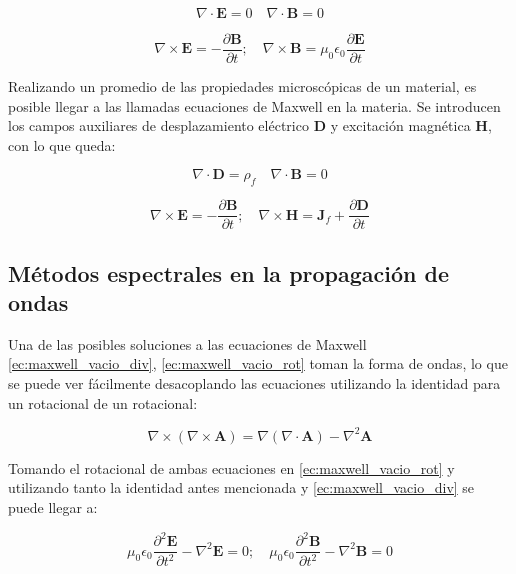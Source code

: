 \begin{equation}\label{ec:maxwell_vacio_div}
    \nabla\cdot \mathbf{E} = 0 \quad \nabla\cdot \mathbf{B} = 0 
\end{equation}

\begin{equation}\label{ec:maxwell_vacio_rot}
    \nabla\times\mathbf{E} = - \frac{\partial\mathbf{B}}{\partial t}; \quad \nabla\times \mathbf{B} = \mu_0\epsilon_0 \frac{\partial\mathbf{E}}{\partial t}
\end{equation}

Realizando un promedio de las propiedades microscópicas de un material, es posible llegar a las llamadas ecuaciones de Maxwell en la materia. Se introducen los campos auxiliares de desplazamiento eléctrico $\mathbf{D}$ y excitación magnética $\mathbf{H}$, con lo que queda:

\begin{equation}\label{ec:maxwell_materia_div}
    \nabla\cdot \mathbf{D} = \rho_f \quad \nabla\cdot \mathbf{B} = 0 
\end{equation}

\begin{equation}\label{ec:maxwell_materia_rot}
    \nabla\times\mathbf{E} = - \frac{\partial\mathbf{B}}{\partial t}; \quad \nabla\times \mathbf{H} = \mathbf{J}_f+ \frac{\partial\mathbf{D}}{\partial t}
\end{equation}

\subsection{Métodos espectrales en la propagación de ondas}\label{subsec:espectral_onda}

Una de las posibles soluciones a las ecuaciones de Maxwell \ref{ec:maxwell_vacio_div}, \ref{ec:maxwell_vacio_rot} toman la forma de ondas, lo que se puede ver fácilmente desacoplando las ecuaciones utilizando la identidad para un rotacional de un rotacional:

\begin{equation}
    \nabla\times(\nabla\times\mathbf{A}) = \nabla(\nabla\cdot\mathbf{A}) - \nabla^2\mathbf{A}
\end{equation}

Tomando el rotacional de ambas ecuaciones en \ref{ec:maxwell_vacio_rot} y utilizando tanto la identidad antes mencionada y \ref{ec:maxwell_vacio_div} se puede llegar a: 

\begin{equation}
    \mu_0\epsilon_0 \frac{\partial^2\mathbf{E}}{\partial t^2} - \nabla^2 \mathbf{E} = 0; \quad
    \mu_0\epsilon_0 \frac{\partial^2\mathbf{B}}{\partial t^2} - \nabla^2 \mathbf{B} = 0
\end{equation}

